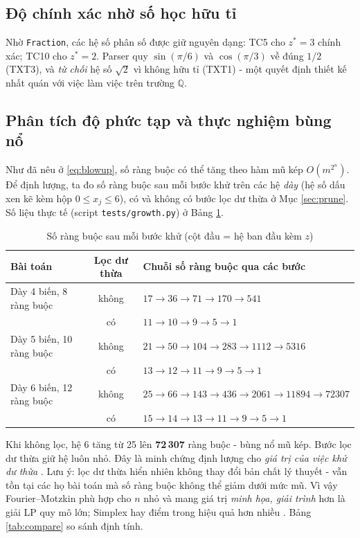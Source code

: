 \documentclass[12pt,a4paper]{article}
\theoremstyle{definition}
\newcommand{\Q}{\mathbb{Q}}
\begin{document}
\subsection{Độ chính xác nhờ số học hữu tỉ}

Nhờ \texttt{Fraction}, các hệ số phân số được giữ nguyên dạng: TC5 cho
$z^\ast = 3$ chính xác; TC10 cho $z^\ast = 2$. Parser quy $\sin(\pi/6)$ và
$\cos(\pi/3)$ về đúng $1/2$ (TXT3), và \emph{từ chối} hệ số $\sqrt{2}$ vì không
hữu tỉ (TXT1) - một quyết định thiết kế nhất quán với việc làm việc trên
trường $\Q$.

\subsection{Phân tích độ phức tạp và thực nghiệm bùng nổ}
\label{sec:growth}

Như đã nêu ở \eqref{eq:blowup}, số ràng buộc có thể tăng theo hàm mũ kép
$O(m^{2^n})$. Để định lượng, ta đo số ràng buộc sau mỗi bước khử trên các hệ
\emph{dày} (hệ số dấu xen kẽ kèm hộp $0 \le x_j \le 6$), có và không có bước
lọc dư thừa ở Mục \ref{sec:prune}. Số liệu thực tế (script
\texttt{tests/growth.py}) ở Bảng \ref{tab:growth}.

\begin{table}[H]
\centering
\caption{Số ràng buộc sau mỗi bước khử (cột đầu = hệ ban đầu kèm $z$)}
\label{tab:growth}
\small
\begin{tabularx}{\textwidth}{lcX}
\toprule
\textbf{Bài toán} & \textbf{Lọc dư thừa} & \textbf{Chuỗi số ràng buộc qua các bước} \\
\midrule
Dày 4 biến, 8 ràng buộc  & không & $17 \to 36 \to 71 \to 170 \to 541$ \\
                          & có    & $11 \to 10 \to 9 \to 5 \to 1$ \\
\midrule
Dày 5 biến, 10 ràng buộc & không & $21 \to 50 \to 104 \to 283 \to 1112 \to 5316$ \\
                          & có    & $13 \to 12 \to 11 \to 9 \to 5 \to 1$ \\
\midrule
Dày 6 biến, 12 ràng buộc & không & $25 \to 66 \to 143 \to 436 \to 2061 \to 11894 \to 72307$ \\
                          & có    & $15 \to 14 \to 13 \to 11 \to 9 \to 5 \to 1$ \\
\bottomrule
\end{tabularx}
\end{table}

Khi không lọc, hệ 6 tăng từ 25 lên \textbf{72\,307} ràng buộc - bùng nổ mũ kép. Bước lọc dư thừa giữ hệ luôn nhỏ. Đây là minh chứng định lượng
cho \emph{giá trị của việc khử dư thừa}
\cite{vanderbei2014, schrijver1986}. Lưu ý: lọc dư thừa hiển nhiên không thay
đổi bản chất lý thuyết - vẫn tồn tại các họ bài toán mà số ràng buộc không
thể giảm dưới mức mũ. Vì vậy Fourier--Motzkin phù hợp cho $n$ nhỏ và mang giá
trị \emph{minh họa, giải trình} hơn là giải LP quy mô lớn; Simplex hay điểm
trong hiệu quả hơn nhiều \cite{bertsimas1997, vanderbei2014}. Bảng
\ref{tab:compare} so sánh định tính.
\end{document}
